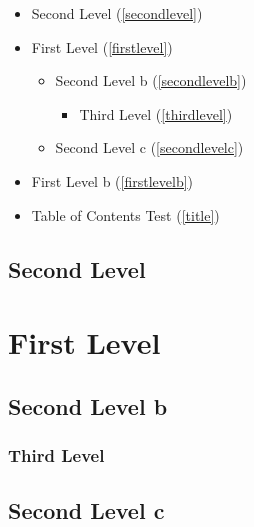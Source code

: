 
\def\mytitle{Table of Contents Test}


\begin{itemize}
\item Second Level (\autoref{secondlevel})

\item First Level (\autoref{firstlevel})

\begin{itemize}
\item Second Level b (\autoref{secondlevelb})

\begin{itemize}
\item Third Level (\autoref{thirdlevel})

\end{itemize}

\item Second Level c (\autoref{secondlevelc})

\end{itemize}

\item First Level b (\autoref{firstlevelb})

\item Table of Contents Test (\autoref{title})

\end{itemize}

\chapter{Second Level}
\label{secondlevel}

\part{First Level}
\label{firstlevel}

\chapter{Second Level b}
\label{secondlevelb}

\section{Third Level}
\label{thirdlevel}

\chapter{Second Level c}
\label{secondlevelc}


